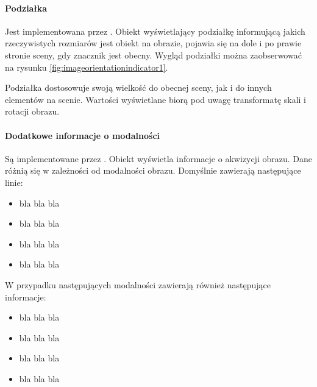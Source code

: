 \paragraph{Podziałka}

Jest implementowana przez .
Obiekt wyświetlający podziałkę informującą jakich rzeczywistych rozmiarów jest obiekt na obrazie, pojawia się na dole i po prawie stronie sceny, gdy znacznik  jest obecny.
Wygląd podziałki można zaobserwować na rysunku \ref{fig:imageorientationindicator1}.

Podziałka dostosowuje swoją wielkość do obecnej sceny, jak i do innych elementów na scenie.
Wartości wyświetlane biorą pod uwagę transformatę skali i rotacji obrazu.

\paragraph{Dodatkowe informacje o modalności}

Są implementowane przez .
Obiekt wyświetla informacje o akwizycji obrazu.
Dane różnią się w zależności od modalności obrazu.
Domyślnie zawierają następujące linie:
\begin{itemize}
    \item bla bla bla
    \item bla bla bla
    \item bla bla bla
    \item bla bla bla
\end{itemize}

W przypadku następujących modalności zawierają również następujące informacje:
\begin{itemize}
    \item bla bla bla
    \item bla bla bla
    \item bla bla bla
    \item bla bla bla
\end{itemize}